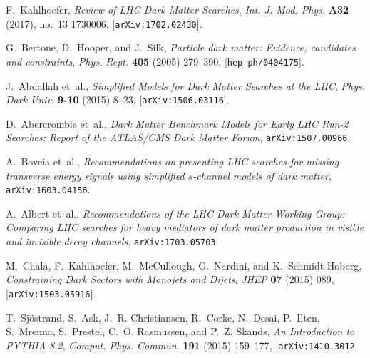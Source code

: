 \documentclass[a4paper, 11pt,notoc]{article}
\begin{document}
\providecommand{\href}[2]{#2}\begingroup\raggedright\begin{thebibliography}{100}

F.~Kahlhoefer, {\it {Review of LHC Dark Matter Searches}},  {\em Int. J. Mod.
  Phys.} {\bf A32} (2017), no.~13 1730006,
  [\href{http://arxiv.org/abs/1702.02430}{{\tt arXiv:1702.02430}}].

G.~Bertone, D.~Hooper, and J.~Silk, {\it {Particle dark matter: Evidence,
  candidates and constraints}},  {\em Phys. Rept.} {\bf 405} (2005) 279--390,
  [\href{http://arxiv.org/abs/hep-ph/0404175}{{\tt hep-ph/0404175}}].

J.~Abdallah et~al., {\it {Simplified Models for Dark Matter Searches at the
  LHC}},  {\em Phys. Dark Univ.} {\bf 9-10} (2015) 8--23,
  [\href{http://arxiv.org/abs/1506.03116}{{\tt arXiv:1506.03116}}].

D.~Abercrombie et~al., {\it {Dark Matter Benchmark Models for Early LHC Run-2
  Searches: Report of the ATLAS/CMS Dark Matter Forum}},
  \href{http://arxiv.org/abs/1507.00966}{{\tt arXiv:1507.00966}}.

A.~Boveia et~al., {\it {Recommendations on presenting LHC searches for missing
  transverse energy signals using simplified $s$-channel models of dark
  matter}},  \href{http://arxiv.org/abs/1603.04156}{{\tt arXiv:1603.04156}}.

A.~Albert et~al., {\it {Recommendations of the LHC Dark Matter Working Group:
  Comparing LHC searches for heavy mediators of dark matter production in
  visible and invisible decay channels}},
  \href{http://arxiv.org/abs/1703.05703}{{\tt arXiv:1703.05703}}.

M.~Chala, F.~Kahlhoefer, M.~McCullough, G.~Nardini, and K.~Schmidt-Hoberg, {\it
  {Constraining Dark Sectors with Monojets and Dijets}},  {\em JHEP} {\bf 07}
  (2015) 089, [\href{http://arxiv.org/abs/1503.05916}{{\tt arXiv:1503.05916}}].

T.~Sj{\"o}strand, S.~Ask, J.~R. Christiansen, R.~Corke, N.~Desai, P.~Ilten,
  S.~Mrenna, S.~Prestel, C.~O. Rasmussen, and P.~Z. Skands, {\it {An
  Introduction to PYTHIA 8.2}},  {\em Comput. Phys. Commun.} {\bf 191} (2015)
  159--177, [\href{http://arxiv.org/abs/1410.3012}{{\tt arXiv:1410.3012}}].

\end{thebibliography}\endgroup
\end{document}
